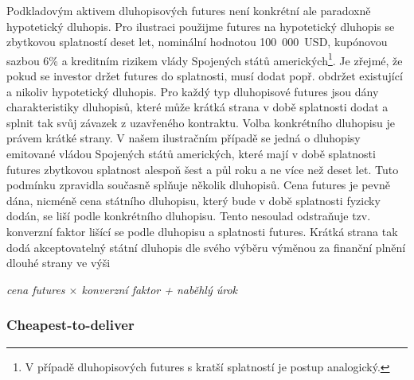 \documentclass[a4paper]{book}
\begin{document}
Podkladovým aktivem dluhopisových futures není konkrétní ale paradoxně hypotetický dluhopis. Pro ilustraci použijme futures na hypotetický dluhopis se zbytkovou splatností deset let, nominální hodnotou 100~000~USD, kupónovou sazbou 6\% a kreditním rizikem vlády Spojených států amerických\footnote{V případě dluhopisových futures s kratší splatností je postup analogický.}. Je zřejmé, že pokud se investor držet futures do splatnosti, musí dodat popř. obdržet existující a nikoliv hypotetický dluhopis. Pro každý typ dluhopisové futures jsou dány charakteristiky dluhopisů, které může krátká strana v době splatnosti dodat a splnit tak svůj závazek z uzavřeného kontraktu. Volba konkrétního dluhopisu je právem krátké strany. V našem ilustračním případě se jedná o dluhopisy emitované vládou Spojených států amerických, které mají v době splatnosti futures zbytkovou splatnost alespoň šest a půl roku a ne více než deset let. Tuto podmínku zpravidla současně splňuje několik dluhopisů. Cena futures je pevně dána, nicméně cena státního dluhopisu, který bude v době splatnosti fyzicky dodán, se liší podle konkrétního dluhopisu. Tento nesoulad odstraňuje tzv. konverzní faktor lišící se podle dluhopisu a splatnosti futures. Krátká strana tak dodá akceptovatelný státní dluhopis dle svého výběru výměnou za finanční plnění dlouhé strany ve výši
\begin{center}
\textit{cena futures $\times$ konverzní faktor + naběhlý úrok}
\end{center}

\subsubsection{Cheapest-to-deliver}
\end{document}
